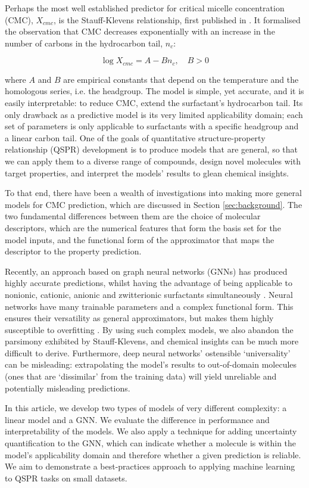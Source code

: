 Perhaps the most well established predictor for critical micelle concentration
(CMC), $X_{cmc}$, is the Stauff-Klevens relationship, first published in
\citeyear{klevensStructureAggregationDilate1953}
\cite{klevensStructureAggregationDilate1953}. It formalised the observation that
CMC decreases exponentially with an increase in the number of carbons in the
hydrocarbon tail, $n_c$:

\begin{equation}
    \label{eq:klevens}
    \log X_{cmc} = A - Bn_c, \quad B > 0
\end{equation}

where $A$ and $B$ are empirical constants that depend on the temperature and the
homologous series, i.e. the headgroup. The model is simple, yet accurate, and it
is easily interpretable: to reduce CMC, extend the surfactant's hydrocarbon
tail. Its only drawback as a predictive model is its very limited applicability
domain; each set of parameters is only applicable to surfactants with a specific
headgroup and a linear carbon tail. One of the goals of quantitative
structure-property relationship (QSPR) development is to produce models that are
general, so that we can apply them to a diverse range of compounds, design novel
molecules with target properties, and interpret the models' results to glean
chemical insights.

To that end, there have been a wealth of investigations into making more general
models for CMC prediction, which are discussed in Section \ref{sec:background}.
The two fundamental differences between them are the choice of molecular
descriptors, which are the numerical features that form the basis set for the
model inputs, and the functional form of the approximator that maps the
descriptor to the property prediction. 

Recently, an approach based on graph neural networks (GNNs) has produced highly
accurate predictions, whilst having the advantage of being applicable to
nonionic, cationic, anionic and zwitterionic surfactants simultaneously
\cite{qinPredictingCriticalMicelle2021}. Neural networks have many
trainable parameters and a complex functional form. This ensures their
versatility as general approximators, but makes them highly susceptible to
overfitting \cite{bejaniSystematicReviewOverfitting2021}. By using such complex
models, we also abandon the parsimony exhibited by Stauff-Klevens, and chemical
insights can be much more difficult to derive. Furthermore, deep neural
networks' ostensible `universality' can be misleading: extrapolating the model's
results to out-of-domain molecules (ones that are `dissimilar' from the training
data) will yield unreliable and potentially misleading predictions.

In this article, we develop two types of models of very different complexity: a
linear model and a GNN. We evaluate the difference in performance and
interpretability of the models. We also apply a technique for adding uncertainty
quantification to the GNN, which can indicate whether a molecule is within the
model's applicability domain and therefore whether a given prediction is
reliable. We aim to demonstrate a best-practices approach to applying machine
learning to QSPR tasks on small datasets.
